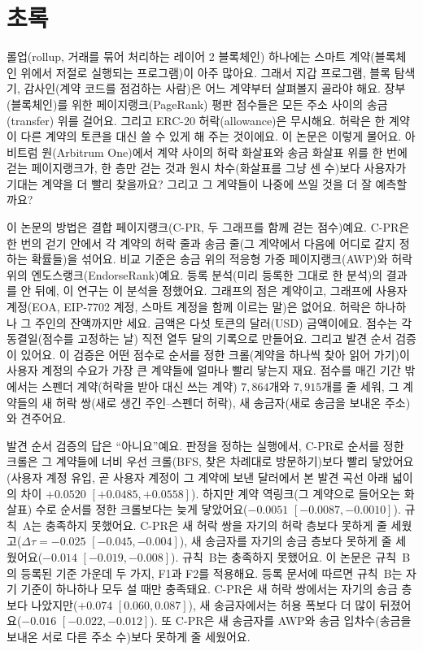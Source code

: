 
\chapter*{초록}

\label{ch:abstract}

롤업(rollup, 거래를 묶어 처리하는 레이어 2 블록체인) 하나에는 스마트 계약(블록체인 위에서 저절로 실행되는 프로그램)이 아주 많아요. 그래서 지갑 프로그램, 블록 탐색기, 감사인(계약 코드를 점검하는 사람)은 어느 계약부터 살펴볼지 골라야 해요. 장부(블록체인)를 위한 페이지랭크(PageRank) 평판 점수들은 모든 주소 사이의 송금(transfer) 위를 걸어요. 그리고 ERC-20 허락(allowance)은 무시해요. 허락은 한 계약이 다른 계약의 토큰을 대신 쓸 수 있게 해 주는 것이에요. 이 논문은 이렇게 물어요. 아비트럼 원(Arbitrum One)에서 계약 사이의 허락 화살표와 송금 화살표 위를 한 번에 걷는 페이지랭크가, 한 층만 걷는 것과 원시 차수(화살표를 그냥 센 수)보다 사용자가 기대는 계약을 더 빨리 찾을까요? 그리고 그 계약들이 나중에 쓰일 것을 더 잘 예측할까요?

이 논문의 방법은 결합 페이지랭크(\mbox{C-PR}, 두 그래프를 함께 걷는 점수)예요. \mbox{C-PR}은 한 번의 걷기 안에서 각 계약의 허락 줄과 송금 줄(그 계약에서 다음에 어디로 갈지 정하는 확률들)을 섞어요. 비교 기준은 송금 위의 적응형 가중 페이지랭크(AWP)와 허락 위의 엔도스랭크(EndorseRank)예요. 등록 분석(미리 등록한 그대로 한 분석)의 결과를 안 뒤에, 이 연구는 이 분석을 정했어요. 그래프의 점은 계약이고, 그래프에 사용자 계정(EOA, EIP-7702 계정, 스마트 계정을 함께 이르는 말)은 없어요. 허락은 하나하나 그 주인의 잔액까지만 세요. 금액은 다섯 토큰의 달러(USD) 금액이에요. 점수는 각 동결일(점수를 고정하는 날) 직전 열두 달의 기록으로 만들어요. 그리고 발견 순서 검증이 있어요. 이 검증은 어떤 점수로 순서를 정한 크롤(계약을 하나씩 찾아 읽어 가기)이 사용자 계정의 수요가 가장 큰 계약들에 얼마나 빨리 닿는지 재요. 점수를 매긴 기간 밖에서는 스펜더 계약(허락을 받아 대신 쓰는 계약) $7{,}864$개와 $7{,}915$개를 줄 세워, 그 계약들의 새 허락 쌍(새로 생긴 주인–스펜더 허락), 새 송금자(새로 송금을 보내온 주소)와 견주어요.

발견 순서 검증의 답은 “아니요”예요. 판정을 정하는 실행에서, \mbox{C-PR}로 순서를 정한 크롤은 그 계약들에 너비 우선 크롤(BFS, 찾은 차례대로 방문하기)보다 빨리 닿았어요(사용자 계정 유입, 곧 사용자 계정이 그 계약에 보낸 달러에서 본 발견 곡선 아래 넓이의 차이 $+0.0520$ $[+0.0485,+0.0558]$). 하지만 계약 역링크(그 계약으로 들어오는 화살표) 수로 순서를 정한 크롤보다는 늦게 닿았어요($-0.0051$ $[-0.0087,-0.0010]$). 규칙~A는 충족하지 못했어요. \mbox{C-PR}은 새 허락 쌍을 자기의 허락 층보다 못하게 줄 세웠고($\Delta\tau=-0.025$ $[-0.045,-0.004]$), 새 송금자를 자기의 송금 층보다 못하게 줄 세웠어요($-0.014$ $[-0.019,-0.008]$). 규칙~B는 충족하지 못했어요. 이 논문은 규칙~B의 등록된 기준 가운데 두 가지, F1과 F2를 적용해요. 등록 문서에 따르면 규칙~B는 자기 기준이 하나하나 모두 설 때만 충족돼요. \mbox{C-PR}은 새 허락 쌍에서는 자기의 송금 층보다 나았지만($+0.074$ $[0.060,0.087]$), 새 송금자에서는 허용 폭보다 더 많이 뒤졌어요($-0.016$ $[-0.022,-0.012]$). 또 \mbox{C-PR}은 새 송금자를 AWP와 송금 입차수(송금을 보내온 서로 다른 주소 수)보다 못하게 줄 세웠어요.

